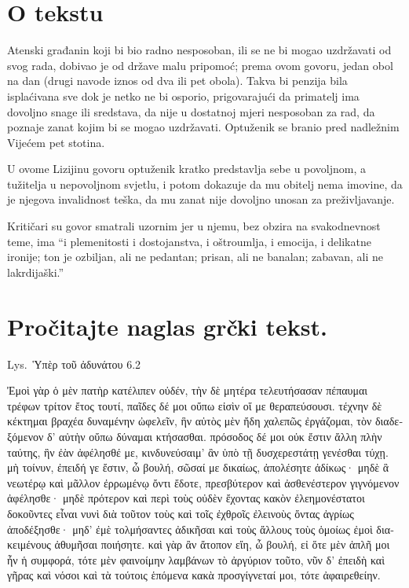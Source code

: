 


\section*{O tekstu}

Atenski građanin koji bi bio radno nesposoban, ili se ne bi mogao uzdržavati od svog rada, dobivao je od države malu pripomoć; prema ovom govoru, jedan obol na dan (drugi navode iznos od dva ili pet obola). Takva bi penzija bila isplaćivana sve dok je netko ne bi osporio, prigovarajući da primatelj ima dovoljno snage ili sredstava, da nije u dostatnoj mjeri nesposoban za rad, da poznaje zanat kojim bi se mogao uzdržavati. Optuženik se branio pred nadležnim Vijećem pet stotina.

U ovome Lizijinu govoru optuženik kratko predstavlja sebe u povoljnom, a tužitelja u nepovoljnom svjetlu, i potom dokazuje da mu obitelj nema imovine, da je njegova invalidnost teška, da mu zanat nije dovoljno unosan za preživljavanje.

Kritičari su govor smatrali uzornim jer u njemu, bez obzira na svakodnevnost teme, ima ``i plemenitosti i dostojanstva, i oštroumlja, i emocija, i delikatne ironije; ton je ozbiljan, ali ne pedantan; prisan, ali ne banalan; zabavan, ali ne lakrdijaški.''


\section*{Pročitajte naglas grčki tekst.}

Lys.\ Ὑπὲρ τοῦ ἀδυνάτου 6.2

\medskip

{\large
\begin{greek}
\noindent Ἐμοὶ γὰρ ὁ μὲν πατὴρ κατέλιπεν οὐδέν, τὴν δὲ μητέρα τελευτήσασαν πέπαυμαι τρέφων τρίτον ἔτος τουτί, παῖδες δέ μοι οὔπω εἰσὶν οἵ με θεραπεύσουσι. τέχνην δὲ κέκτημαι βραχέα δυναμένην ὠφελεῖν, ἣν αὐτὸς μὲν ἤδη χαλεπῶς ἐργάζομαι, τὸν διαδεξόμενον δ' αὐτὴν οὔπω δύναμαι κτήσασθαι. πρόσοδος δέ μοι οὐκ ἔστιν ἄλλη πλὴν ταύτης, ἣν ἐὰν ἀφέλησθέ με, κινδυνεύσαιμ' ἂν ὑπὸ τῇ δυσχερεστάτῃ γενέσθαι τύχῃ. μὴ τοίνυν, ἐπειδή γε ἔστιν, ὦ βουλή, σῶσαί με δικαίως, ἀπολέσητε ἀδίκως· μηδὲ ἃ νεωτέρῳ καὶ μᾶλλον ἐρρωμένῳ ὄντι ἔδοτε, πρεσβύτερον καὶ ἀσθενέστερον γιγνόμενον ἀφέλησθε· μηδὲ πρότερον καὶ περὶ τοὺς οὐδὲν ἔχοντας κακὸν ἐλεημονέστατοι δοκοῦντες εἶναι νυνὶ διὰ τοῦτον τοὺς καὶ τοῖς ἐχθροῖς ἐλεινοὺς ὄντας ἀγρίως ἀποδέξησθε· μηδ' ἐμὲ τολμήσαντες ἀδικῆσαι καὶ τοὺς ἄλλους τοὺς ὁμοίως ἐμοὶ διακειμένους ἀθυμῆσαι ποιήσητε. καὶ γὰρ ἂν ἄτοπον εἴη, ὦ βουλή, εἰ ὅτε μὲν ἁπλῆ μοι ἦν ἡ συμφορά, τότε μὲν φαινοίμην λαμβάνων τὸ ἀργύριον τοῦτο, νῦν δ' ἐπειδὴ καὶ γῆρας καὶ νόσοι καὶ τὰ τούτοις ἑπόμενα κακὰ προσγίγνεταί μοι, τότε ἀφαιρεθείην.

\end{greek}
}
